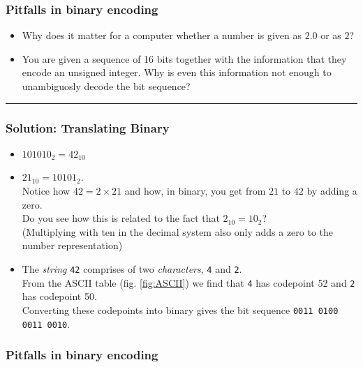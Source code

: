 \subsubsection*{Pitfalls in binary encoding}
\begin{itemize}
\item Why does it matter for a computer whether a number is given as $2.0$ or as $2$?
\item You are given a sequence of 16 bits together with the information that they encode an unsigned integer. Why is even this information not enough to unambiguosly decode the bit sequence?
\end{itemize}

\rule{\linewidth}{0.1mm}

\subsubsection*{Solution: Translating Binary}
\begin{itemize}
\item $101010_2 = 42_{10}$
\item $21_{10} = 10101_2$. \\
	Notice how $42 = 2 \times 21$ and how, in binary, you get from $21$ to $42$ by adding a zero.\\
	Do you see how this is related to the fact that $2_{10} = 10_2$?\\
	(Multiplying with ten in the decimal system also only adds a zero to the number representation)
\item The \emph{string} \texttt{42} comprises of two \emph{characters}, \texttt{4} and \texttt{2}.\\
	From the ASCII table (fig. \ref{fig:ASCII}) we find that \texttt{4} has codepoint 52 and \texttt{2} has codepoint 50.\\
	Converting these codepoints into binary gives the bit sequence \texttt{0011 0100  0011 0010}.
\end{itemize}

\subsubsection*{Pitfalls in binary encoding}